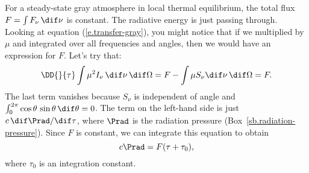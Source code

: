  For a steady-state gray atmosphere in local thermal equilibrium, the total flux $F = \int F_{\nu}\,\dif\nu$ is constant. The radiative energy is just passing through. Looking at equation (\ref{e.transfer-gray}), you might notice that if we multiplied by $\mu$ and integrated over all frequencies and angles, then we would have an expression for $F$. Let's try that:
\[
	\DD{}{\tau}\int\mu^{2}I_{\nu}\,\dif\nu\,\dif\Omega = F - \int \mu S_{\nu}\dif\nu\,\dif\Omega = F.
\]
The last term vanishes because $S_{\nu}$ is independent of angle and $\int_{0}^{2\pi} \cos\theta\,\sin\theta\,\dif\theta = 0$.  The term on the left-hand side is just $c\,\dif\Prad/\dif\tau$, where $\Prad$ is the radiation pressure (Box~\ref{sb.radiation-pressure}). Since $F$ is constant, we can integrate this equation to obtain
\[
	c\Prad = F(\tau + \tau_{0}),
\]
where $\tau_{0}$ is an integration constant.


